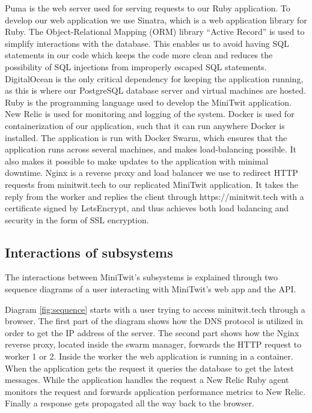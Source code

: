 \documentclass{article}
\begin{document}
Puma is the web server used for serving requests to our Ruby application. 
To develop our web application we use Sinatra, which is a web application library for Ruby. 
The Object-Relational Mapping (ORM) library ``Active Record'' is used to simplify interactions with the database. This enables us to avoid having SQL statements in our code which keeps the code more clean and reduces the possibility of SQL injections from improperly escaped SQL statements.
DigitalOcean is the only critical dependency for keeping the application running, as this is where our PostgreSQL database server and virtual machines are hosted.
Ruby is the programming language used to develop the MiniTwit application.
New Relic is used for monitoring and logging of the system. 
Docker is used for containerization of our application, such that it can run anywhere Docker is installed. The application is run with Docker Swarm, which ensures that the application runs across several machines, and makes load-balancing possible. It also makes it possible to make updates to the application with minimal downtime.
Nginx is a reverse proxy and load balancer we use to redirect HTTP requests from minitwit.tech to our replicated MiniTwit application. 
It takes the reply from the worker and replies the client through https://minitwit.tech with a certificate signed by LetsEncrypt, 
and thus achieves both load balancing and security in the form of SSL encryption.

\subsection{Interactions of subsystems}

The interactions between MiniTwit's subsystems is explained through two sequence diagrams of a user interacting with MiniTwit's web app and the API. 

Diagram \ref{fig:sequence} starts with a user trying to access minitwit.tech through a browser. The first part of the diagram shows how the DNS protocol is utilized in order to get the IP address of the server. The second part shows how the Nginx reverse proxy, located inside the swarm manager, forwards the HTTP request to worker 1 or 2. Inside the worker the web application is running in a container. When the application gets the request it queries the database to get the latest messages. While the application handles the request a New Relic Ruby agent monitors the request and forwards application performance metrics to New Relic. Finally a response gets propagated all the way back to the browser.
\end{document}
